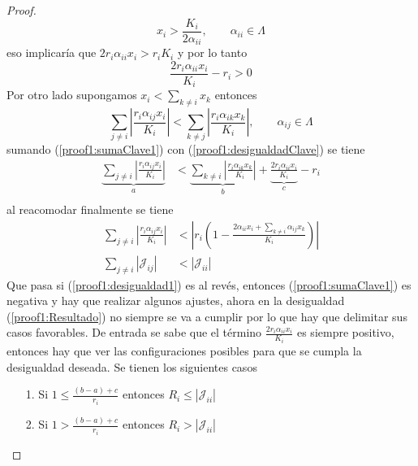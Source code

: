 \begin{proposición}
\begin{proof}
		\begin{equation}\label{proof1:desigualdad1}
			x_i>\frac{K_i}{2\alpha_{ii}},\qquad\alpha_{ii}\in\Lambda
		\end{equation}
		eso implicaría que $2r_i\alpha_{ii}x_i>r_iK_i$ y por lo tanto 
		\begin{equation}\label{proof1:sumaClave1}
			\frac{2r_i\alpha_{ii}x_i}{K_i}-r_i>0
		\end{equation}
		Por otro lado supongamos $x_i<\sum_{k\neq i}x_k$ entonces 
		\begin{equation}\label{proof1:desigualdadClave}
			\sum_{j\neq i}\left |\frac{r_i\alpha_{ij}x_i}{K_i}\right |<\sum_{k\neq j}\left |\frac{r_i\alpha_{ik}x_k}{K_i}\right |,\qquad\alpha_{ij}\in\Lambda
		\end{equation}
		sumando (\ref{proof1:sumaClave1}) con (\ref{proof1:desigualdadClave}) se tiene 
		\begin{equation*}
			\begin{split}
				\underbrace{\sum_{j\neq i}\left |\frac{r_i\alpha_{ij}x_i}{K_i}\right |}_a&<\underbrace{\sum_{k\neq i}\left |\frac{r_i\alpha_{ik}x_k}{K_i}\right |}_b+\underbrace{\frac{2r_i\alpha_{ii}x_i}{K_i}}_c-r_i\\				
			\end{split}
		\end{equation*}
		al reacomodar finalmente se tiene
		\begin{equation}\label{proof1:Resultado}
			\begin{split}
				\sum_{j\neq i}\left |\frac{r_i\alpha_{ij}x_i}{K_i}\right |&<\left |r_i\left (1-\frac{2\alpha_{ii}x_i+\sum_{k\neq i}\alpha_{ij}x_k}{K_i}\right )\right |\\
				\sum_{j\neq i}|\mathcal{J}_{ij}|&<|\mathcal{J}_{ii}|
			\end{split}
		\end{equation}
		Que pasa si (\ref{proof1:desigualdad1}) es al revés, entonces (\ref{proof1:sumaClave1}) es negativa y hay que realizar algunos ajustes, ahora en la desigualdad (\ref{proof1:Resultado}) no siempre se va a cumplir por lo que hay que delimitar sus casos favorables. De entrada se sabe que el término $\frac{2r_i\alpha_{ii}x_i}{K_i}$ es siempre positivo, entonces hay que ver las configuraciones posibles para que se cumpla la desigualdad deseada. Se tienen los siguientes casos
		\begin{itemize}
			\item [1.] Si $1\leq\frac{(b-a)+c}{r_i}$ entonces $R_i\leq|\mathcal{J}_{ii}|$			
			\item [2.] Si $1>\frac{(b-a)+c}{r_i}$ entonces $R_i>|\mathcal{J}_{ii}|$

\end{itemize}
\end{proof}
\end{proposición}
